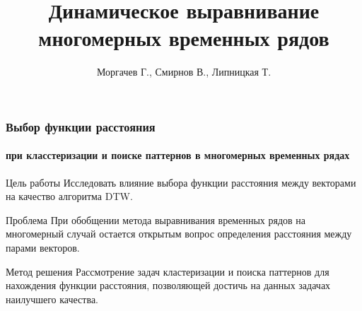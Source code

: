 \documentclass{beamer}
\title[\hbox to 56mm{DTW  \hfill\insertframenumber\,/\,\inserttotalframenumber}]
{Динамическое выравнивание многомерных временных рядов}
\author{Моргачев Г., Смирнов В., Липницкая Т.}
\institute{Московский физико-технический институт}
\date{\footnotesize{
\par\emph{Курс:} Автоматизация научных исследований в машинном обучении\par (практика, В.В. Стрижов)/2019
\par\emph{Консультант:} Гончаров А.
\date{\today}
}}
\begin{document}

\begin{frame}
\titlepage 
\end{frame}


\begin{frame}
\frametitle{Выбор функции расстояния}
\framesubtitle{при класстеризации и поиске паттернов в многомерных временных рядах}
    \begin{block}{Цель работы}
        Исследовать влияние выбора функции расстояния между векторами на 
        качество алгоритма DTW.
    \end{block}
    \begin{block}{Проблема}
        При обобщении метода выравнивания временных рядов на многомерный случай остается 
        открытым вопрос определения расстояния между парами векторов.
    \end{block}
    \begin{block}{Метод решения}
        Рассмотрение задач кластеризации и поиска паттернов для нахождения функции расстояния,
        позволяющей достичь на данных задачах наилучшего качества.
    \end{block}
\end{frame}
\end{document}

